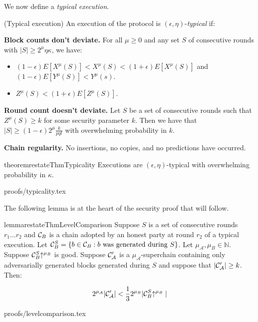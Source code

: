 We now define a \textit{typical execution}.

\begin{definition}{(Typical execution)}
    An execution of the protocol is $(\epsilon, \eta)$-\textit{typical} if:

    \textnormal{\bf Block counts don't deviate.}
    For all $\mu \geq 0$ and any set $S$ of consecutive rounds
    with $|S| \geq 2^\mu \eta\kappa$, we have:

    \begin{itemize}
        \item $(1 - \epsilon)E[X^\mu(S)] < X^\mu(S) < (1 + \epsilon)E[X^\mu(S)]$ and $(1 - \epsilon)E[Y^\mu(S)] < Y^\mu(s)$.
        \item $Z^\mu(S) < (1 + \epsilon)E[Z^\mu(S)]$.
    \end{itemize}

    \textnormal{\bf Round count doesn't deviate.}
    Let $S$ be a set of consecutive rounds such that $Z^\mu(S)
    \geq k$ for some security parameter $k$. Then we have that $|S| \geq (1 -
    \epsilon)2^\mu\frac{k}{pqt}$ with overwhelming probability in $k$.

    \textnormal{\bf Chain regularity.}
    No insertions, no copies, and no predictions \cite{backbone} have occurred.
\end{definition}

\begin{restatable}[Typicality]{theorem}{restateThmTypicality}
\label{thm.typicality}
Executions are $(\epsilon, \eta)$-typical with overwhelming
probability in $\kappa$.
\end{restatable}
\ifonecolumn
{proofs/typicality.tex}
\fi

The following lemma is at the heart of the security proof that will follow.

\begin{restatable}{lemma}{restateThmLevelComparison}\label{lem.level-comparison}
    Suppose $S$ is a set of consecutive rounds $r_1 \ldots r_2$
    and $\mathcal{C}_B$ is
    a chain adopted by an honest party at round $r_2$ of a typical execution.
    Let $\mathcal{C}_B^S = \{b \in
    \mathcal{C}_B: b \textnormal{ was generated during } S\}$. Let $\mu_\mathcal{A},
    \mu_B \in \mathbb{N}$. Suppose $\mathcal{C}_B^S\negthickspace\uparrow^{\mu_B}$ is good.
    Suppose $\mathcal{C}'_\mathcal{A}$ is a $\mu_\mathcal{A}$-superchain containing
    only adversarially generated blocks generated during $S$ and suppose that
    $|\mathcal{C}'_\mathcal{A}| \geq k$.
    Then:

    \begin{equation*}
    2^{\mu_\mathcal{A}}|\mathcal{C}'_\mathcal{A}| < \frac{1}{3}2^{\mu_B}|\mathcal{C}_B^S\negthickspace\uparrow^{\mu_B}|
    \end{equation*}
\end{restatable}
\ifonecolumn
{proofs/levelcomparison.tex}
\fi

